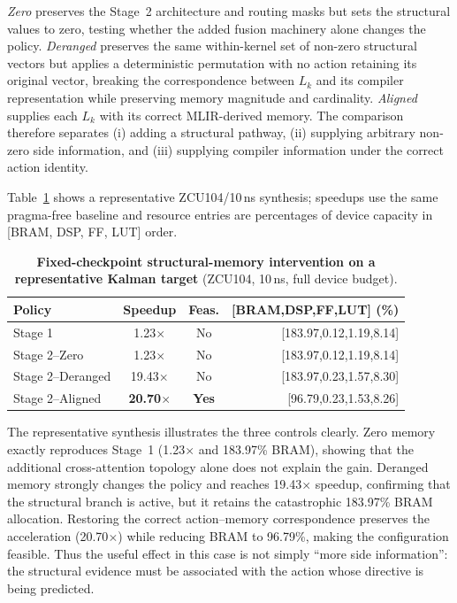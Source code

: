 \emph{Zero} preserves the Stage~2 architecture and routing masks but sets the structural values to zero, testing whether the added fusion machinery alone changes the policy. \emph{Deranged} preserves the same within-kernel set of non-zero structural vectors but applies a deterministic permutation with no action retaining its original vector, breaking the correspondence between $L_k$ and its compiler representation while preserving memory magnitude and cardinality. \emph{Aligned} supplies each $L_k$ with its correct MLIR-derived memory. The comparison therefore separates (i) adding a structural pathway, (ii) supplying arbitrary non-zero side information, and (iii) supplying compiler information under the correct action identity.

Table~\ref{tab:memory-ablation} shows a representative ZCU104/10\,ns synthesis; speedups use the same pragma-free baseline and resource entries are percentages of device capacity in [BRAM, DSP, FF, LUT] order.

\begin{table}[t]
    \centering
    \caption{\textbf{Fixed-checkpoint structural-memory intervention on a
    representative Kalman target} (ZCU104, 10\,ns, full device budget).}
    \label{tab:memory-ablation}
    \scriptsize
    \setlength{\tabcolsep}{3.0pt}
    \renewcommand{\arraystretch}{1.08}

    \begin{tabular}{lccr}
        \toprule
        \textbf{Policy} &
        \textbf{Speedup} &
        \textbf{Feas.} &
        \textbf{[BRAM,DSP,FF,LUT] (\%)} \\
        \midrule
        Stage 1
          & 1.23$\times$  & No  & [183.97,0.12,1.19,8.14] \\
        Stage 2--Zero
          & 1.23$\times$  & No  & [183.97,0.12,1.19,8.14] \\
        Stage 2--Deranged
          & 19.43$\times$ & No  & [183.97,0.23,1.57,8.30] \\
        Stage 2--Aligned
          & \textbf{20.70$\times$} & \textbf{Yes}
          & [96.79,0.23,1.53,8.26] \\
        \bottomrule
    \end{tabular}
\end{table}

The representative synthesis illustrates the three controls clearly.
Zero memory exactly reproduces Stage~1 (1.23$\times$ and 183.97\% BRAM), showing that the additional cross-attention topology alone does not explain the gain. Deranged memory strongly changes the policy and reaches 19.43$\times$ speedup, confirming that the structural branch is active, but it retains the catastrophic 183.97\% BRAM allocation. Restoring the correct action--memory correspondence preserves the acceleration (20.70$\times$) while reducing BRAM to 96.79\%, making the configuration feasible. Thus the useful effect in this case is not simply ``more side
information'': the structural evidence must be associated with the action whose directive is being predicted. 




